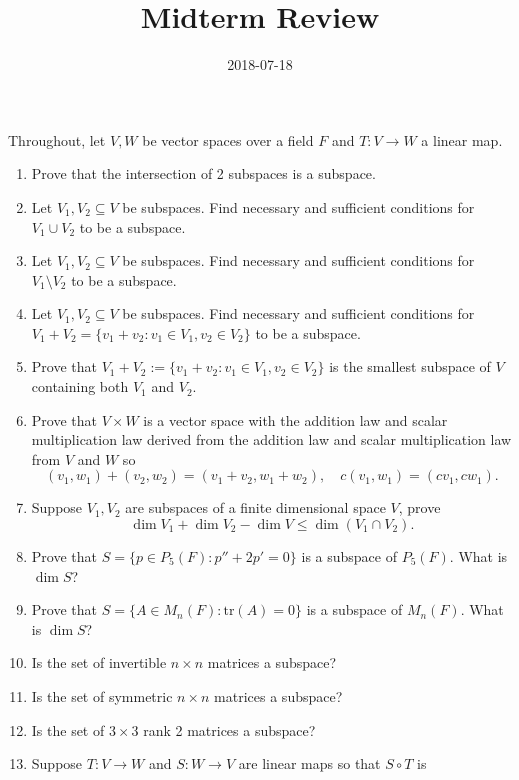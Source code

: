 \documentclass{article}
\title{Midterm Review}
\date{2018-07-18}
\begin{document}
\maketitle

Throughout, let $V,W$ be vector spaces over a field $F$ and $T:V\to W$ a linear
map.
\begin{enumerate}
    \item
        Prove that the intersection of 2 subspaces is a subspace.
    \item
        Let $V_1,V_2\subseteq V$ be subspaces. Find necessary and sufficient
        conditions for $V_1\cup V_2$ to be a subspace.
    \item
        Let $V_1,V_2\subseteq V$ be subspaces. Find necessary and sufficient
        conditions for $V_1\setminus V_2$ to be a subspace.
    \item
        Let $V_1,V_2\subseteq V$ be subspaces. Find necessary and sufficient
        conditions for $V_1+ V_2=\{v_1+v_2:v_1\in V_1, v_2\in V_2\}$ to be a
        subspace.
    \item
        Prove that $V_1+V_2:=\{v_1+v_2:v_1\in V_1, v_2\in V_2\}$ is the
        smallest subspace of $V$ containing both $V_1$ and $V_2$.
    \item
        Prove that $V\times W$ is a vector space with the addition law and
        scalar multiplication law derived from the addition law and scalar
        multiplication law from $V$ and $W$ so
        \[
            (v_1, w_1)+(v_2,w_2)=(v_1+v_2, w_1+w_2), \quad
            c(v_1,w_1)=(cv_1,cw_1).
        \]
    \item
        Suppose $V_1, V_2$ are subspaces of a finite dimensional space $V$, prove
        \[
            \dim V_1+\dim V_2 -\dim V \leq \dim (V_1\cap V_2).
        \]
    \item
        Prove that $S=\{p\in P_5(F):p''+2p'=0\}$ is a subspace of $P_5(F)$.
        What is $\dim S$?
    \item
        Prove that $S = \{A\in M_n(F):\mathrm{tr}(A)=0\}$ is a subspace
        of $M_n(F)$. What is $\dim S$?
    \item
        Is the set of invertible $n\times n$ matrices a subspace?
    \item
        Is the set of symmetric $n\times n$ matrices a subspace?
    \item
        Is the set of $3\times 3$ rank 2 matrices a subspace?
    \item
        Suppose $T:V\to W$ and $S:W\to V$ are linear maps so that $S\circ T$ is

\end{enumerate}
\end{document}
